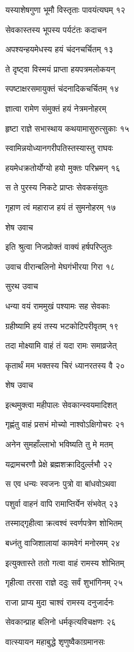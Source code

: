 यस्याशेषगुणा भूमौ विस्तृताः पावयंत्यघम् १२

सेवकास्तस्य भूपस्य पर्यटंतः कदाचन

अपश्यन्हयमेधस्य हयं चंदनचर्चितम् १३

ते दृष्ट्वा विस्मयं प्राप्ता हयपत्रमलोकयन्

स्पष्टाक्षरसमायुक्तं चंदनादिकचर्चितम् १४

ज्ञात्वा रामेण संमुक्तं हयं नेत्रमनोहरम्

हृष्टा राज्ञे सभास्थाय कथयामासुरुत्सुकाः १५

स्वामिन्नयोध्यानगरीपतिस्तस्यास्तु राघवः

हयमेधक्रतोर्योग्यो हयो मुक्तः परिभ्रमन् १६

स ते पुरस्य निकटे प्राप्तः सेवकसंयुतः

गृहाण त्वं महाराज हयं तं सुमनोहरम् १७

शेष उवाच

इति श्रुत्वा निजप्रोक्तं वाक्यं हर्षपरिप्लुतः

उवाच वीरान्बलिनो मेघगंभीरया गिरा १८

सुरथ उवाच

धन्या वयं राममुखं पश्यामः सह सेवकाः

ग्रहीष्यामि हयं तस्य भटकोटिपरीवृतम् १९

तदा मोक्ष्यामि वाहं तं यदा रामः समाव्रजेत्

कृतार्थं मम भक्तस्य चिरं ध्यानरतस्य वै २०

शेष उवाच

इत्थमुक्त्वा महीपालः सेवकान्स्वयमादिशत्

गृह्णंतु वाहं प्रसभं मोच्यो नाश्वोऽक्षिगोचरः २१

अनेन सुमहाँल्लाभो भविष्यति तु मे मतम्

यद्रामचरणौ प्रेक्षे ब्रह्मशक्रादिदुर्ल्लभौ २२

स एव धन्यः स्वजनः पुत्रो वा बांधवोऽथवा

पशुर्वा वाहनं वापि रामाप्तिर्येन संभवेत् २३

तस्माद्गृहीत्वा क्रत्वश्वं स्वर्णपत्रेण शोभितम्

बध्नंतु वाजिशालायां कामवेगं मनोरमम् २४

इत्युक्तास्ते ततो गत्वा वाहं रामस्य शोभितम्

गृहीत्वा तरसा राज्ञे ददुः सर्वं शुभांगिनम् २५

राजा प्राप्य मुदा चाश्वं रामस्य दनुजार्दनः

सेवकान्प्राह बलिनो धर्मकृत्यविचक्षणः २६

वात्स्यायन महाबुद्धे शृणुष्वैकाग्रमानसः

